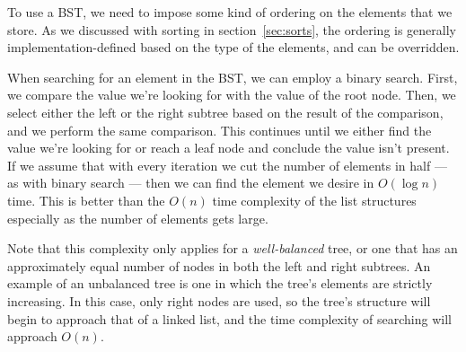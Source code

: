 To use a BST, we need to impose some kind of ordering on the elements that we store. As we discussed with sorting in section~\ref{sec:sorts}, the ordering is generally implementation-defined based on the type of the elements, and can be overridden.

When searching for an element in the BST, we can employ a binary search. First, we compare the value we're looking for with the value of the root node. Then, we select either the left or the right subtree based on the result of the comparison, and we perform the same comparison. This continues until we either find the value we're looking for or reach a leaf node and conclude the value isn't present. If we assume that with every iteration we cut the number of elements in half --- as with binary search --- then we can find the element we desire in $O(\log n)$ time. This is better than the $O(n)$ time complexity of the list structures especially as the number of elements gets large.

Note that this complexity only applies for a \textit{well-balanced} tree, or one that has an approximately equal number of nodes in both the left and right subtrees. An example of an unbalanced tree is one in which the tree's elements are strictly increasing. In this case, only right nodes are used, so the tree's structure will begin to approach that of a linked list, and the time complexity of searching will approach $O(n)$.

